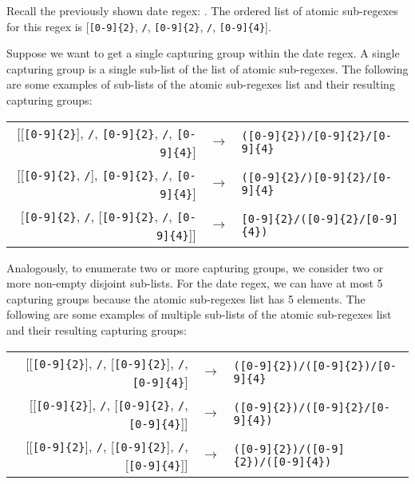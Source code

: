 \begin{example}
Recall the previously shown date regex: . The ordered list of atomic sub-regexes for this regex is [\verb![0-9]{2}!, \verb!/!, \verb![0-9]{2}!, \verb!/!, \verb![0-9]{4}!].

Suppose we want to get a single capturing group within the date regex. 
A single capturing group is a single sub-list of the list of atomic sub-regexes.
The following are some examples of sub-lists of the atomic sub-regexes list and their resulting capturing groups:

\begin{center}
\setlength{\extrarowheight}{10pt}
\begin{tabular}{rcl}
[[\verb![0-9]{2}!], \verb!/!, \verb![0-9]{2}!, \verb!/!, \verb![0-9]{4}!] & $\rightarrow$ & \verb!([0-9]{2})/[0-9]{2}/[0-9]{4}! \\

[[\verb![0-9]{2}!, \verb!/!], \verb![0-9]{2}!, \verb!/!, \verb![0-9]{4}!] & $\rightarrow$ & \verb!([0-9]{2}/)[0-9]{2}/[0-9]{4}! \\

[\verb![0-9]{2}!, \verb!/!, [\verb![0-9]{2}!, \verb!/!, \verb![0-9]{4}!]] & $\rightarrow$ & \verb![0-9]{2}/([0-9]{2}/[0-9]{4})!
\end{tabular}\bigskip
\end{center}


Analogously, to enumerate two or more capturing groups, we consider two or more non-empty disjoint sub-lists. For the date regex, we can have at most 5 capturing groups because the atomic sub-regexes list has 5 elements. The following are some examples of multiple sub-lists of the atomic sub-regexes list and their resulting capturing groups:

\begin{center}
\setlength{\extrarowheight}{10pt}
\begin{tabular}{rcl}
[[\verb![0-9]{2}!], \verb!/!, [\verb![0-9]{2}!], \verb!/!, \verb![0-9]{4}!] & $\rightarrow$ & \verb!([0-9]{2})/([0-9]{2})/[0-9]{4}! \\

[[\verb![0-9]{2}!], \verb!/!, [\verb![0-9]{2}!, \verb!/!, \verb![0-9]{4}!]] & $\rightarrow$ & \verb!([0-9]{2})/([0-9]{2}/[0-9]{4})! \\

[[\verb![0-9]{2}!], \verb!/!, [\verb![0-9]{2}!], \verb!/!, [\verb![0-9]{4}!]] & $\rightarrow$ & \verb!([0-9]{2})/([0-9]{2})/([0-9]{4})!
\end{tabular}\bigskip
\end{center}
\end{example}

